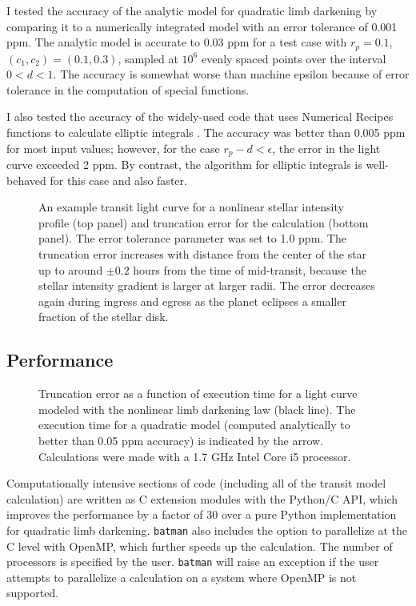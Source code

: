 \documentclass[12pt,preprint]{aastex}
\begin{document}
I tested the accuracy of the analytic model for quadratic limb darkening by comparing it to a numerically integrated model with an error tolerance of 0.001 ppm.  The analytic model is accurate to 0.03 ppm for a test case with $r_p = 0.1$, $(c_1, c_2) = (0.1, 0.3)$, sampled at $10^6$ evenly spaced points over the interval $0 < d < 1$.  The accuracy is somewhat worse than machine epsilon because of error tolerance in the computation of special functions.

I also tested the accuracy of the widely-used \cite{mandel02} code that uses Numerical Recipes functions to calculate elliptic integrals \citep{press92}.  The accuracy was better than 0.005 ppm for most input values; however, for the case $r_p - d < \epsilon$, the error in the light curve exceeded 2 ppm. By contrast, the \cite{bulirsch65} algorithm for elliptic integrals is well-behaved for this case and also faster.

\begin{figure}
\caption{An example transit light curve for a nonlinear stellar intensity profile (top panel) and truncation error for the calculation (bottom panel).  The error tolerance parameter was set to 1.0 ppm.  The truncation error increases with distance from the center of the star up to around $\pm0.2$ hours from the time of mid-transit, because the stellar intensity gradient is larger at larger radii. The error decreases again during ingress and egress as the planet eclipses a smaller fraction of the stellar disk.}
\label{fig:transit}
\end{figure}


\subsection{Performance}
\begin{figure}
\caption{Truncation error as a function of execution time for a light curve modeled with the nonlinear limb darkening law (black line). The execution time for a quadratic model (computed analytically to better than 0.05 ppm accuracy) is indicated by the arrow. Calculations were made with a 1.7 GHz Intel Core i5 processor.} 
\label{fig:performance}
\end{figure}

Computationally intensive sections of code (including all of the transit model calculation) are written as C extension modules with the Python/C API, which improves the performance by a factor of 30 over a pure Python implementation for quadratic limb darkening.  \texttt{batman} also includes the option to parallelize at the C level with OpenMP, which further speeds up the calculation. The number of processors is specified by the user.  \texttt{batman} will raise an exception if the user attempts to parallelize a calculation on a system where OpenMP is not supported.
\end{document}
